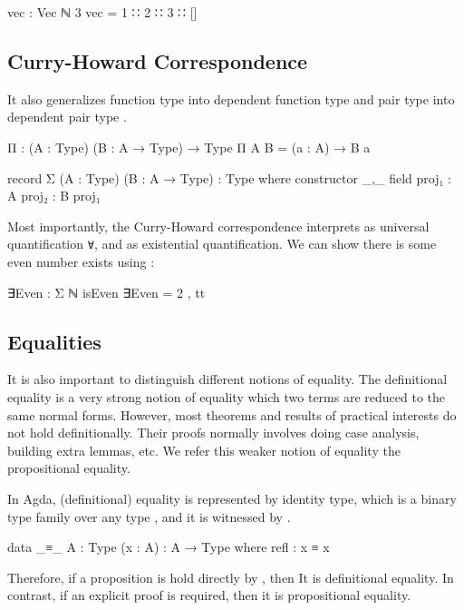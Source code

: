 \begin{code}
vec : Vec ℕ 3
vec = 1 ∷ 2 ∷ 3 ∷ []
\end{code}

\subsection*{Curry-Howard Correspondence}

It also generalizes function type  into dependent function type  and pair type  into dependent pair type .

\begin{code}
Π : (A : Type) (B : A → Type) → Type
Π A B = (a : A) → B a

record Σ (A : Type) (B : A → Type) : Type where
  constructor _,_
  field
    proj₁ : A
    proj₂ : B proj₁
\end{code}

Most importantly, the Curry-Howard correspondence interprets  as universal quantification \texttt{∀}, and  as existential quantification. We can show there is some even number exists using :

\begin{code}
∃Even : Σ ℕ isEven
∃Even = 2 , tt
\end{code}

\subsection*{Equalities}

It is also important to distinguish different notions of equality. The definitional equality is a very strong notion of equality which two terms are reduced to the same normal forms. However, most theorems and results of practical interests do not hold definitionally. Their proofs normally involves doing case analysis, building extra lemmas, etc. We refer this weaker notion of equality the propositional equality.

In Agda, (definitional) equality is represented by identity type, which is a binary type family over any type , and it is witnessed by .

\begin{code}
data _≡_ {A : Type} (x : A) : A → Type where
  refl : x ≡ x
\end{code}

Therefore, if a proposition is hold directly by , then It is definitional equality. In contrast, if an explicit proof is required, then it is propositional equality.

